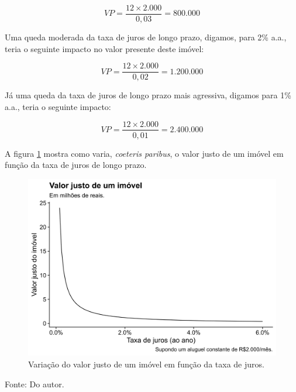 \documentclass[
	12pt,				%
	oneside,			%
	a4paper,			%
	chapter=TITLE,		%
	section=TITLE,		%
	english,			%
	brazil				%
	]{abntex2}
\newcommand{\bcenter}{\begin{center}}
\newcommand{\ecenter}{\end{center}}
\begin{document}
\[VP = \frac{12 \times 2.000}{0,03} = 800.000\]

Uma queda moderada da taxa de juros de longo prazo, digamos, para 2\% a.a.,
teria o seguinte impacto no valor presente deste imóvel:

\[VP = \frac{12 \times 2.000}{0,02} = 1.200.000\]

Já uma queda da taxa de juros de longo prazo mais agressiva, digamos para 1\%
a.a., teria o seguinte impacto:

\[VP = \frac{12 \times 2.000}{0,01} = 2.400.000\]

A figura \ref{fig:valores-juros} mostra como varia, \emph{coeteris paribus}, o valor
justo de um imóvel em função da taxa de juros de longo prazo.
\begin{figure}[H]

{\centering \includegraphics[width=0.7\linewidth]{images/valores-juros-1} 

}

\caption{Variação do valor justo de um imóvel em função da taxa de juros.}\label{fig:valores-juros}
\end{figure}
\bcenter

Fonte: Do autor.
\ecenter
\end{document}
